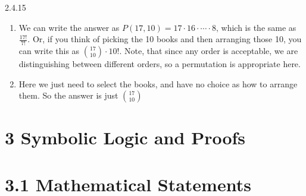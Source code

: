 \documentclass[11pt,]{book}
\theoremstyle{ptxplainnotitle}
\theoremstyle{ptxplaintitle}
\theoremstyle{ptxdefinitionnotitle}
\theoremstyle{ptxdefinitiontitle}
\theoremstyle{ptxdefinitionnotitle}
\theoremstyle{ptxdefinitiontitle}
\theoremstyle{ptxdefinitionnotitle}
\theoremstyle{ptxdefinitiontitle}
\theoremstyle{ptxdefinitiontitlenonumber}
\theoremstyle{ptxdefinitiontitlenonumber}
\numberwithin{equation}{chapter}
\begin{document}
\begin{divisionexercise}{2.4.15}
\textbf{}\hypertarget{p-1703}{}%
\leavevmode%
\begin{enumerate}[label=(\alph*)]
\item\hypertarget{li-721}{}\hypertarget{p-1704}{}%
We can write the answer as \(P(17,10) = 17 \cdot 16 \cdot \cdots \cdot 8\text{,}\) which is the same as \(\frac{17!}{7!}\text{.}\)  Or, if you think of picking the 10 books and then arranging those 10, you can write this as \(\binom{17}{10}\cdot 10!\text{.}\)  Note, that since any order is acceptable, we are distinguishing between different orders, so a permutation is appropriate here.%
\item\hypertarget{li-722}{}\hypertarget{p-1705}{}%
Here we just need to select the books, and have no choice as how to arrange them.  So the answer is just \(\binom{17}{10}\)%
\end{enumerate}
%
\end{divisionexercise}%
\section*{3 Symbolic Logic and Proofs}
\section*{3.1 Mathematical Statements}
\end{document}
